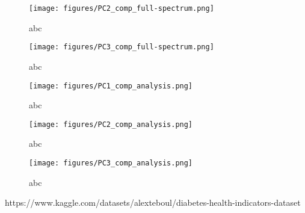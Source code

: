 \documentclass{article}
\begin{document}
	\begin{figure}[ht]
		\begin{center} 
		\centering
			\texttt{[image: figures/PC2\_comp\_full-spectrum.png]}
			\caption{abc}
			\end{center}
		\end{figure}	

	\begin{figure}[ht]
		\begin{center} 
		\centering
			\texttt{[image: figures/PC3\_comp\_full-spectrum.png]}
			\caption{abc}
			\end{center}
		\end{figure}

	\begin{figure}[ht]
		\begin{center} 
		\centering
			\texttt{[image: figures/PC1\_comp\_analysis.png]}
			\caption{abc}
			\end{center}
		\end{figure}

	\begin{figure}[ht]
		\begin{center} 
		\centering
			\texttt{[image: figures/PC2\_comp\_analysis.png]}
			\caption{abc}
			\end{center}
		\end{figure}

	\begin{figure}[ht]
		\begin{center} 
		\centering
			\texttt{[image: figures/PC3\_comp\_analysis.png]}
			\caption{abc}
			\end{center}
		\end{figure}




\pagebreak

\begin{thebibliography}{9}
     https://www.kaggle.com/datasets/alexteboul/diabetes-health-indicators-dataset
    \end{thebibliography}
    
    
\end{document}
